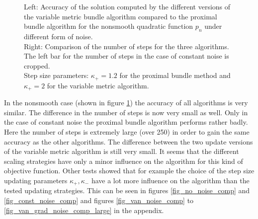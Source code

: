 \begin{figure}[ht]
	\begin{subfigure}[t]{0.49\textwidth}
	\end{subfigure}
	\begin{subfigure}[t]{0.49\textwidth}
	\end{subfigure}
	\caption{Left: Accuracy of the solution computed by the different versions of the variable metric bundle algorithm compared to the proximal bundle algorithm for the nonsmooth quadratic function \(p_n\) under different form of noise.\\
	Right: Comparison of the number of steps for the three algorithms. The left bar for the number of steps in the case of constant noise is cropped.\\
	Step size parameters: \(\kappa_+ = 1.2\) for the proximal bundle method and \(\kappa_+ = 2\) for the variable metric algorithm.}
	\label{fig_bar_nonsm_parab}
\end{figure}

In the nonsmooth case (shown in figure \ref{fig_bar_nonsm_parab}) the accuracy of all algorithms is very similar. The difference in the number of steps is now very small as well.
Only in the case of constant noise the proximal bundle algorithm performs rather badly. Here the number of steps is extremely large (over 250) in order to gain the same accuracy as the other algorithms.
The difference between the two update versions of the variable metric algorithm is still very small. It seems that the different scaling strategies have only a minor influence on the algorithm for this kind of objective function. Other tests showed that for example the choice of the step size updating parameters \(\kappa_+, \kappa_-\) have a lot more influence on the algorithm than the tested updating strategies. This can be seen in figures \ref{fig_no_noise_comp}  and \ref{fig_const_noise_comp} and figures \ref{fig_van_noise_comp} to \ref{fig_van_grad_noise_comp_large} in the appendix.



